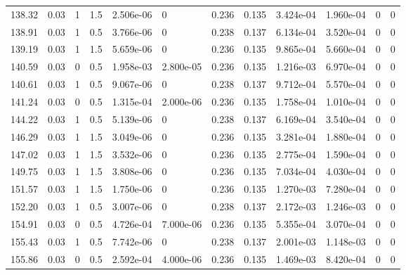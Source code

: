 \documentclass[preview]{standalone}
\begin{document}
{{\begin{tabular}{L{1.2cm}C{1.2cm} C{0.3cm}C{0.5cm} C{1.4cm}C{1.4cm} C{1.4cm}C{1.4cm} C{1.6cm}C{1.6cm} C{1.6cm}C{1.6cm}}
  138.32  &  0.03  & 1     & 1.5 &  2.506e-06  & 0  &  0.236&   0.135& 3.424e-04 & 1.960e-04   &  0 & 0  \\ 
  138.91  &  0.03  & 1     & 0.5 &  3.766e-06  & 0  &  0.238&   0.137& 6.134e-04 & 3.520e-04   &  0 & 0  \\ 
  139.19  &  0.03  & 1     & 1.5 &  5.659e-06  & 0  &  0.236&   0.135& 9.865e-04 & 5.660e-04   &  0 & 0  \\ 
  140.59  &  0.03  & 0     & 0.5 &  1.958e-03  & 2.800e-05  &  0.236&   0.135& 1.216e-03 & 6.970e-04   &  0 & 0  \\ 
  140.61  &  0.03  & 1     & 0.5 &  9.067e-06  & 0  &  0.238&   0.137& 9.712e-04 & 5.570e-04   &  0 & 0  \\ 
  141.24  &  0.03  & 0     & 0.5 &  1.315e-04  & 2.000e-06  &  0.236&   0.135& 1.758e-04 & 1.010e-04   &  0 & 0  \\ 
  144.22  &  0.03  & 1     & 0.5 &  5.139e-06  & 0  &  0.238&   0.137& 6.169e-04 & 3.540e-04   &  0 & 0  \\ 
  146.29  &  0.03  & 1     & 1.5 &  3.049e-06  & 0  &  0.236&   0.135& 3.281e-04 & 1.880e-04   &  0 & 0  \\ 
  147.02  &  0.03  & 1     & 1.5 &  3.532e-06  & 0  &  0.236&   0.135& 2.775e-04 & 1.590e-04   &  0 & 0  \\ 
  149.75  &  0.03  & 1     & 1.5 &  3.808e-06  & 0  &  0.236&   0.135& 7.034e-04 & 4.030e-04   &  0 & 0  \\ 
  151.57  &  0.03  & 1     & 1.5 &  1.750e-06  & 0  &  0.236&   0.135& 1.270e-03 & 7.280e-04   &  0 & 0  \\ 
  152.20  &  0.03  & 1     & 0.5 &  3.007e-06  & 0  &  0.238&   0.137& 2.172e-03 & 1.246e-03   &  0 & 0  \\ 
  154.91  &  0.03  & 0     & 0.5 &  4.726e-04  & 7.000e-06  &  0.236&   0.135& 5.355e-04 & 3.070e-04   &  0 & 0  \\ 
  155.43  &  0.03  & 1     & 0.5 &  7.742e-06  & 0  &  0.238&   0.137& 2.001e-03 & 1.148e-03   &  0 & 0  \\ 
  155.86  &  0.03  & 0     & 0.5 &  2.592e-04  & 4.000e-06  &  0.236&   0.135& 1.469e-03 & 8.420e-04   &  0 & 0  \\ 
\hline 
\end{tabular} 

}}
\end{document}
